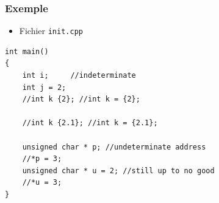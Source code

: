 \begin{frame}[containsverbatim]
\frametitle{Exemple}
\begin{itemize}
\item Fichier \texttt{init.cpp}
\end{itemize}
\begin{lstlisting}
int main()
{
    int i;     //indeterminate
    int j = 2;
    //int k {2}; //int k = {2};
    
    //int k {2.1}; //int k = {2.1};
    
    unsigned char * p; //undeterminate address
    //*p = 3; 
    unsigned char * u = 2; //still up to no good
    //*u = 3;
}
\end{lstlisting}
\end{frame}


